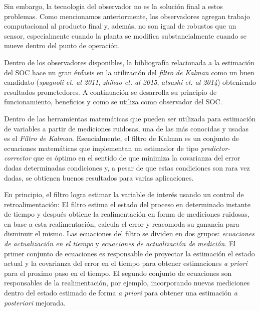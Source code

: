 \documentclass[10pt,a4paper]{article}
\newcounter{subsubsubsection}[subsubsection]
\begin{document}
\noindent Sin embargo, la tecnolog\'ia del observador no es la soluci\'on final
a estos problemas. Como mencionamos anteriormente, los observadores agregan
trabajo computacional al producto final y, adem\'as, no son igual de robustos
que un sensor, especialmente cuando la planta se modifica substancialmente
cuando se mueve dentro del punto de operaci\'on. 

\newpage

\noindent Dentro de los observadores disponibles, la bibliograf\'ia relacionada
a la estimaci\'on del \acrshort{SOC} hace un gran \'enfasis en la utilizaci\'on
del \emph{filtro de Kalman} como un buen candidato (\emph{spagnoli et. al 2011}, 
\emph{zhihao et. al 2015}, \emph{atsushi et. al 2014}) obteniendo resultados
prometedores. A continuaci\'on se desarrolla su principio de funcionamiento, 
beneficios y como se utiliza como observador del \acrshort{SOC}.

\label{kalmanFilterMethod}

\noindent Dentro de las herramientas matem\'aticas que pueden ser utilizada para
estimaci\'on de variables a partir de mediciones ruidosas, una de las m\'as
conocidas y usadas es el \emph{Filtro de Kalman}. Esencialmente, el filtro de
Kalman es un conjunto de ecuaciones matem\'aticas que implementan un estimador
de tipo \emph{predictor-corrector} que es \'optimo en el sentido de que minimiza
la covarianza del error dadas determinadas condiciones y, a pesar de que estas
condiciones son rara vez dadas, se obtienen buenos resultados para varias
aplicaciones.

\noindent En principio, el filtro logra estimar la variable de inter\'es usando 
un control de retroalimentaci\'on: El filtro estima el estado del proceso en 
determinado instante de tiempo y despu\'es obtiene la realimentaci\'on en forma 
de mediciones ruidosas, en base a esta realimentaci\'on, calcula el error y
reacomoda su ganancia para disminuir el mismo. Las ecuaciones del filtro se
dividen en dos grupos: \emph{ecuaciones de actualizaci\'on en el tiempo} 
y \emph{ecuaciones de actualizaci\'on de medici\'on}. El primer conjunto de
ecuaciones es responsable de proyectar la estimaci\'on el estado actual y la
covarianza del error en el tiempo para obtener estimaciones \emph{a priori} para
el proximo paso en el tiempo. El segundo conjunto de ecuaciones son responsables
de la realimentaci\'on, por ejemplo, incorporando nuevas mediciones dentro del
estado estimado de forma \emph{a priori} para obtener una estimaci\'on \emph{a
posteriori} mejorada.
\end{document}
